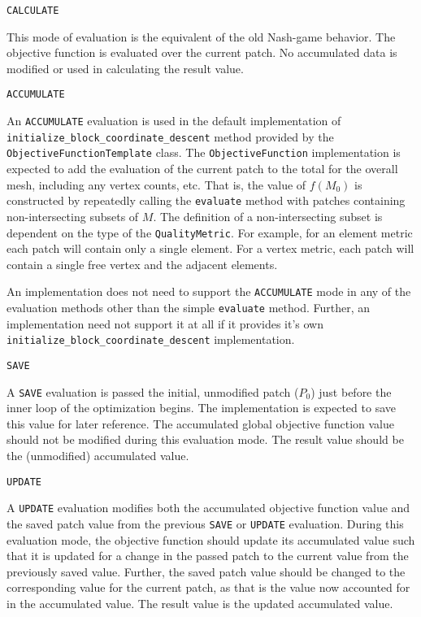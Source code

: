 \documentclass{article}
\begin{document}
\begin{description}

\item{\texttt{CALCULATE}}

This mode of evaluation is the equivalent of the old Nash-game behavior.  The objective function is evaluated over the current patch.  No accumulated data is modified or used in calculating the result value.

\item{\texttt{ACCUMULATE}}

An \texttt{ACCUMULATE} evaluation is used in the default implementation of \\ \texttt{initialize\_block\_coordinate\_descent} method provided by the \\ \texttt{ObjectiveFunctionTemplate} class.  The \texttt{ObjectiveFunction} implementation is expected to add the evaluation of the current patch to the total for the overall mesh, including any vertex counts, etc.  That is, the value of $f(M_0)$ is constructed by repeatedly calling the \texttt{evaluate} method with patches containing non-intersecting subsets of $M$.  The definition of a non-intersecting subset is dependent on the type of the \texttt{QualityMetric}.  For example, for an element metric each patch will contain only a single element.  For a vertex metric, each patch will contain a single free vertex and the adjacent elements.  

An implementation does not need to support the \texttt{ACCUMULATE} mode in any of the evaluation methods other than the simple \texttt{evaluate}  method.  Further, an implementation need not support it at all if it provides it's own \texttt{initialize\_block\_coordinate\_descent} implementation.

\item{\texttt{SAVE}}

A \texttt{SAVE} evaluation is passed the initial, unmodified patch ($P_0$) just before the inner loop of the optimization begins.  The implementation is expected to save this value for later reference.  The accumulated global objective function value should not be modified during this evaluation mode.  The result value should be the (unmodified) accumulated value.

\item{\texttt{UPDATE}}

A \texttt{UPDATE} evaluation modifies both the accumulated objective function value and the saved patch value from the previous \texttt{SAVE} or \texttt{UPDATE} evaluation.  During this evaluation mode, the objective function should update its accumulated value such that it is updated for a change in the passed patch to the current value from the previously saved value.  Further, the saved patch value should be changed to the corresponding value for the current patch, as that is the value now accounted for in the accumulated value.  The result value is the updated accumulated value.


\end{description}
\end{document}

